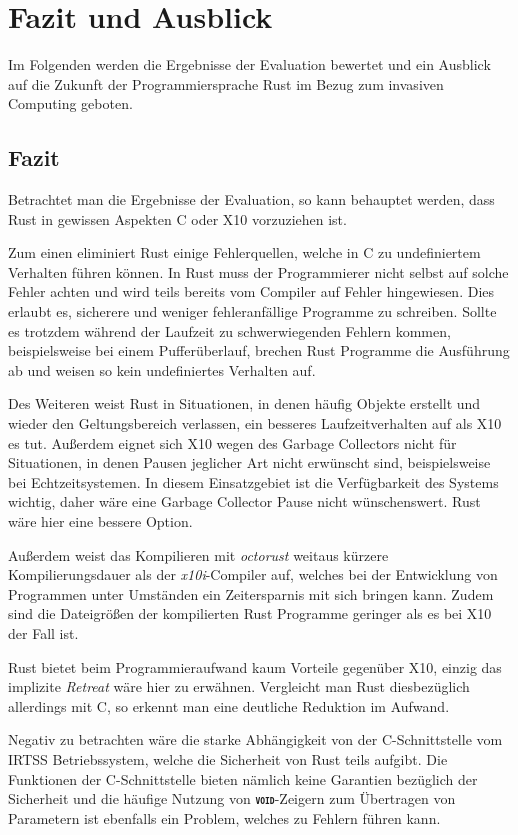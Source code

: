 \chapter{Fazit und Ausblick}\label{sec:conclusion}

Im Folgenden werden die Ergebnisse der Evaluation bewertet
und ein Ausblick auf die Zukunft der Programmiersprache Rust im Bezug zum invasiven Computing geboten.

\section{Fazit}

Betrachtet man die Ergebnisse der Evaluation, so kann behauptet werden,
dass Rust in gewissen Aspekten C oder X10 vorzuziehen ist.

Zum einen eliminiert Rust einige Fehlerquellen, welche in C zu undefiniertem Verhalten führen können.
In Rust muss der Programmierer nicht selbst auf solche Fehler achten und wird teils bereits vom Compiler auf Fehler
hingewiesen. Dies erlaubt es, sicherere und weniger fehleranfällige Programme zu schreiben.
Sollte es trotzdem während der Laufzeit zu schwerwiegenden Fehlern kommen, beispielsweise bei einem Pufferüberlauf,
brechen Rust Programme die Ausführung ab und weisen so kein undefiniertes Verhalten auf.

Des Weiteren weist Rust in Situationen, in denen häufig Objekte erstellt und wieder den Geltungsbereich verlassen,
ein besseres Laufzeitverhalten auf als X10 es tut. Außerdem eignet sich X10 wegen des Garbage Collectors nicht für 
Situationen, in denen Pausen jeglicher Art nicht erwünscht sind, beispielsweise bei Echtzeitsystemen. In diesem
Einsatzgebiet ist die Verfügbarkeit des Systems wichtig, daher wäre eine Garbage Collector Pause nicht
wünschenswert. Rust wäre hier eine bessere Option.

Außerdem weist das Kompilieren mit \textit{octorust} weitaus kürzere Kompilierungsdauer
als der \textit{x10i}-Compiler auf,
welches bei der Entwicklung von Programmen unter Umständen ein Zeitersparnis
mit sich bringen kann. 
Zudem sind die Dateigrößen der kompilierten Rust Programme geringer als es bei X10 der Fall ist.

Rust bietet beim Programmieraufwand kaum Vorteile gegenüber X10, einzig das implizite \textit{Retreat} wäre hier zu 
erwähnen. Vergleicht man Rust diesbezüglich allerdings mit C, so erkennt man eine deutliche Reduktion im Aufwand.

Negativ zu betrachten wäre die starke Abhängigkeit von der C-Schnittstelle vom IRTSS Betriebssystem,
welche die Sicherheit von Rust teils aufgibt. Die Funktionen der C-Schnittstelle bieten nämlich keine Garantien 
bezüglich der Sicherheit und die häufige Nutzung von \texttt{\textsc{\textbf{void}}}-Zeigern zum Übertragen
von Parametern ist ebenfalls ein Problem, welches zu Fehlern führen kann.

